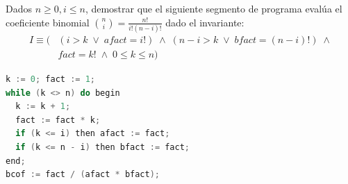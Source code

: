 \begin{ejercicio}
Dados $n \ge 0, i \le n$, demostrar que el siguiente segmento de programa evalúa el coeficiente binomial $\binom{n}{i} = \frac{n!}{i! (n - i)!}$ dado el invariante:
\begin{align*}
I \equiv \big( &(i > k \;\lor\; afact = i!) \;\land\; (n - i > k \;\lor\; bfact = (n - i)!) \;\land \\
& fact = k! \;\land\; 0 \le k \le n \big)
\end{align*}

\begin{lstlisting}[language=C++]
k := 0; fact := 1;
while (k <> n) do begin
  k := k + 1;
  fact := fact * k;
  if (k <= i) then afact := fact;
  if (k <= n - i) then bfact := fact;
end;
bcof := fact / (afact * bfact);
\end{lstlisting}
\end{ejercicio}


